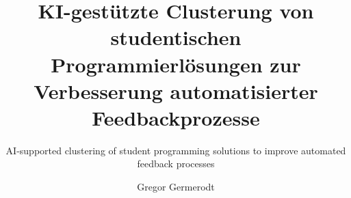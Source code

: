 \documentclass[envcountsame, envcountchap, deutsch]{i-studis}
\begin{document}
\title{KI-gestützte Clusterung von studentischen Programmierlösungen zur Verbesserung automatisierter Feedbackprozesse}
\subtitle{AI-supported clustering of student programming solutions to improve automated feedback processes}

\author{Gregor Germerodt}


\address{Trier}


\mytitlepage

\frontmatter
\tableofcontents										%
\listoffigures											%
\listoftables											%
\lstlistoflistings										%


\mainmatter








\backmatter
\printindex												%


\begin{appendix}
\end{appendix}
\end{document}
